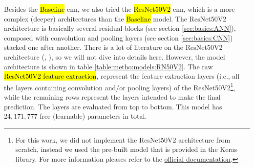

\graphicspath{{./Sections/Methodology/Resources/}}


Besides the \hl{Baseline} \gls{cnn}, we also tried the \hl{ResNet50V2} \gls{cnn}, which is a more complex (deeper) architectures than the \hl{Baseline} model. The ResNet50V2 architecture is basically several residual blocks (see section \ref{sec:basics:ANN}), composed with convolution and pooling layers (see section \ref{sec:basics:CNN}) stacked one after another.
There is a lot of literature on the ResNet50V2 architecture (\cite{he2015deep}, \cite{he2016identity}), so we will not dive into details here. However, the model architecture is shown in table \ref{table:metho:models:RN50V2}.
The raw \hl{ResNet50V2 feature extraction}, represent the feature extraction layers (i.e., all the layers containing convolution and/or pooling layers) of the ResNet50V2\footnote{For this work, we did not implement the ResNet50V2 architecture from scratch, instead we used the pre-built model that is provided in the Keras library. For more information pleases refer to the \href{https://www.tensorflow.org/api_docs/python/tf/keras/applications/ResNet50V2}{official documentation}.}, while the remaining rows represent the layers intended to make the final prediction. The layers are evaluated from top to bottom. This model has $24,171,777$ free (learnable) parameters in total.

\setlength{\mylinewidth}{\linewidth-7pt}%
\setlength{\mylengtha}{0.4\mylinewidth-2\arraycolsep}%
\setlength{\mylengthb}{0.25\mylinewidth-2\arraycolsep}%
\setlength{\mylengthc}{0.18\mylinewidth-2\arraycolsep}%

